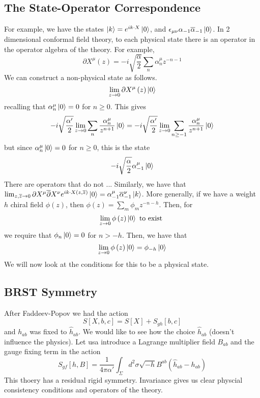 \documentclass[11pt, oneside]{article}   	%
\theoremstyle{slanted}
\begin{document}
\subsection{The State-Operator Correspondence}
For example, 
we have the states $ \ket{ k }  = e ^{ i k \cdot  X } \ket{ 0 } $, 
and $ \epsilon _{ \mu \nu } \alpha _{ -  1 } \overline{ \alpha } _{ - 1 } \ket{ 0 } $. 
In 2 dimensional conformal field theory, to each physical 
state there is an operator in the 
operator algebra of the theory. 
For example, 
\[
	\partial  X ^ \mu \left( z  \right)   =  - i \sqrt{ \frac{\alpha }{ 2 } }  \sum _ n \alpha _ n ^{ \mu } 
	z ^{ - n - 1 } 
\] We can construct a non-physical state as follows. 
\[
	\lim_{ z \to 0 } \partial  X ^ \mu \left( z  \right)  \ket{ 0 } 
\] recalling that $ \alpha _ n ^ \mu \ket{ 0 }  =0 $ for $ n \geq 0$. 
This gives 
\[
  - i \sqrt{\frac{\alpha ' }{  2 } }  \lim _{ z \to 0 } \sum _ n \frac{\alpha _ n ^ \mu }{ z ^{ n + 1 }  } \ket{ 0 } 
   = - i \sqrt{\frac{\alpha '  }{  2 } }  \lim _{ z \to 0 } \sum _{ n \geq - 1 } \frac{\alpha _ n ^ \mu  }{ z 
   ^{ n + 1  } } \ket{ 0 } 
\] but since $ \alpha _ n ^ \mu \ket{ 0 }  = 0 $ for $ n \geq 0 $, this is 
the state 
\[
- i \sqrt{ \frac{\alpha }{  2 } }  \alpha _{ - 1 } ^ \mu \ket{ 0 } 
\] There are operators that  
do not ...
Similarly, we have that $ \lim _{ z , \overline{ z }  \to 0  } \partial  X ^ \mu \overline{ \partial   } X ^ \nu 
e ^{ i k \cdot  X \left( z, \overline{ z  }    \right)   } \ket{ 0 }  = \alpha _{ -  1 } ^ \mu \overline{ \alpha  } _{ - 1 }^ \nu 
\ket{ k }  $. 
More generally, if we have a weight $ h $ chiral field 
$ \phi \left(  z  \right)   $, then $ \phi \left( z  \right)   = \sum _ m \phi _ m z ^{ - n - h }  $. 
Then, for 
\[
	\lim _{ z \to 0 } \phi \left(  z  \right)  \ket{ 0 } \text{ to exist }
\] we require that $ \phi _ n \ket{ 0 }  = 0  $ for $ n > - h $. 
Then, we have that 
\[
	\lim _{ z \to 0 } \phi \left( z  \right)  \ket{ 0 }  = \phi _{- h } \ket{ 0 } 
\]  We will now look at the conditions for 
this to be a physical state. 

\subsection{BRST Symmetry}
After Faddeev-Popov we had the action 
\[
 S \left[  X , b, c  \right]   = S \left[  X  \right]  + S _{ gh } \left[  b, c  \right]  
\] and $ h _{ ab } $ was fixed to $ \hat{ h }_{ ab }  $. 
We would like to see how the choice 
$ \hat{ h}_{ab }  $ (doesn't influence the physics). 
Let usa introduce a Lagrange multiplier field 
$ B _{ ab } $ and the gauge fixing term in the action 
\[
 S _{gf} \left[  h , B  \right]   = \frac{1}{4 \pi \alpha ' } \int _{ \Sigma } 
 d ^ 2 \sigma \sqrt{ - h }  B ^{ ab } \left( \hat{ h } _{ ab }  - h _{ ab }  \right) 
\] This thoery has a residual rigid symmetry. 
Invariance gives us clear physcial consistency conditions 
and operators of the theory. 
\pagebreak 
\end{document}
